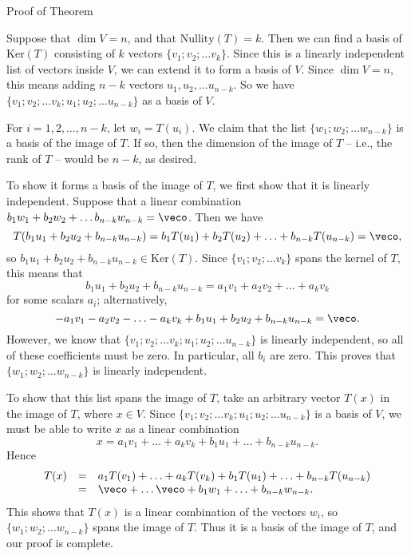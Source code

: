\begin{edXshowhide}{Proof of Theorem}

Suppose that $\dim V = n$, and that 
$\mathrm{Nullity}(T) = k$.  Then we can find a basis of $\mathrm{Ker}(T)$ consisting of $k$ vectors
$\{v_1; v_2; \ldots v_k\}$.  Since this is a linearly independent list of vectors inside $V$, we can extend
it to form a basis of $V$.  Since $\dim V = n$, this means adding $n-k$ vectors $u_1, u_2, \ldots u_{n-k}$.
So we have $\{v_1; v_2; \ldots v_k; u_1; u_2; \ldots u_{n-k} \}$ as a basis of $V$.  

For $i  = 1, 2, \ldots, n-k$, let $w_i = T(u_i)$.  We claim that 
the list $\{w_1; w_2; \ldots w_{n-k}\}$ is a basis of the image of $T$.  If so, then the dimension of the image
of $T$ -- i.e., the rank of $T$ -- would be
$n-k$, as desired.  

To show it forms a basis of the image of $T$, we first show that it is linearly independent.  
Suppose that a linear combination $b_1w_1 + b_2w_2 + \ldots b_{n-k}w_{n-k} = \veco$.  Then we have
\[ T(b_1u_1 + b_2u_2 + b_{n-k}u_{n-k}) = b_1T(u_1)  + b_2T(u_2) + \ldots + b_{n-k}T(u_{n-k}) = \veco,\]
so $b_1u_1 + b_2u_2 + b_{n-k}u_{n-k} \in \mathrm{Ker}(T).$  Since  
$\{v_1; v_2; \ldots v_k\}$ spans the kernel of $T$, this means that 
\[b_1u_1 + b_2u_2 + b_{n-k}u_{n-k} = a_1v_1 + a_2v_2 + \ldots +a_kv_k\]
for some scalars $a_i$; alternatively,
\[ -a_1v_1 - a_2v_2 - \ldots - a_kv_k + b_1u_1 + b_2u_2 + b_{n-k}u_{n-k} = \veco. \]
However, we know that $\{v_1; v_2; \ldots v_k; u_1; u_2; \ldots u_{n-k} \}$ is linearly independent,
so all of these coefficients must be zero.  In particular, all $b_i$ are zero.  This proves that $\{w_1; w_2; \ldots
w_{n-k} \}$ is linearly independent. 

To show that this list spans the image of $T$, take an arbitrary vector $T(x)$ in the image of $T$, where $x\in V$.
Since $\{v_1; v_2; \ldots v_k; u_1; u_2; \ldots u_{n-k} \}$ is a basis of $V$, we must be able to write
$x$ as a linear combination
\[x = a_1v_1 + \ldots + a_k v_k + b_1u_1 + \ldots + b_{n-k}u_{n-k}.\]
Hence 
\[
\begin{array}{rcl} T(x) &= & a_1T(v_1) + \ldots + a_kT(v_k) + b_1 T(u_1) + \ldots + b_{n-k}T(u_{n-k}) \\
& = & \veco + \ldots \veco + b_1w_1 + \ldots + b_{n-k}w_{n-k}.\end{array}
\]
This shows that $T(x)$ is a linear combination of the vectors $w_i$, so $\{w_1; w_2; \ldots
w_{n-k} \}$ spans the image of $T$.  Thus it is a basis of the image of $T$, and our proof is complete.  

\end{edXshowhide}



